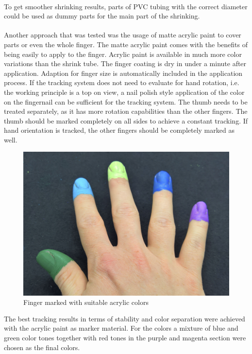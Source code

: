 \\To get smoother shrinking results, parts of PVC tubing with the correct diameter could be used as dummy parts for the main part of the shrinking.\\
\\Another approach that was tested was the usage of matte acrylic paint to cover parts or even the whole finger. The matte acrylic paint comes with the benefits of being easily to apply to the finger. Acrylic paint is available in much more color variations than the shrink tube. The finger coating is dry in under a minute after application. Adaption for finger size is automatically included in the application process. If the tracking system does not need to evaluate for hand rotation, i.e. the working principle is a top on view, a nail polish style application of the color on the fingernail can be sufficient for the tracking system. The thumb needs to be treated separately, as it has more rotation capabilities than the other fingers. The thumb should be marked completely on all sides to achieve a constant tracking. If hand orientation is tracked, the other fingers should be completely marked as well.
\begin{figure}[H]
\centering
\includegraphics[width=\textwidth/2]{images/final_finger_markers.jpg}
\caption{Finger marked with suitable acrylic colors}
\label{img:final_markers}
\end{figure}
The best tracking results in terms of stability and color separation were achieved with the acrylic paint as marker material. For the colors a mixture of blue and green color tones together with red tones in the purple and magenta section were chosen as the final colors.
